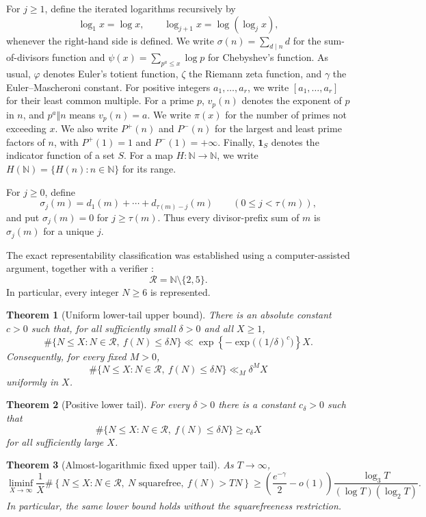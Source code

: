 \documentclass[11pt]{article}
\newtheorem{theorem}{Theorem}[section]
\theoremstyle{remark}
\newcommand{\N}{\mathbb N}
\newcommand{\Rcal}{\mathcal R}
\newcommand{\1}{\mathbf 1}
\begin{document}
For $j\geq1$, define the iterated logarithms recursively by
\[
 \log_1 x=\log x,\qquad \log_{j+1}x=\log(\log_j x),
\]
whenever the right-hand side is defined.  We write $\sigma(n)=\sum_{d\mid n}d$ for the sum-of-divisors
function and $\psi(x)=\sum_{p^a\leq x}\log p$ for Chebyshev's function.
As usual, $\varphi$ denotes Euler's totient function, $\zeta$ the Riemann
zeta function, and $\gamma$ the Euler--Mascheroni constant.  For positive
integers $a_1,\ldots,a_r$, we write $[a_1,\ldots,a_r]$ for their least common
multiple.  For a prime
$p$, $v_p(n)$ denotes the exponent of $p$ in $n$, and $p^a\Vert n$ means
$v_p(n)=a$.  We write $\pi(x)$ for the number of primes not exceeding $x$.
We also write $P^+(n)$ and $P^-(n)$ for the largest and least prime factors
of $n$, with $P^+(1)=1$ and $P^-(1)=+\infty$.  Finally, $\1_S$ denotes the
indicator function of a set $S$.  For a map $H:\N\to\N$, we write
$H(\N)=\{H(n):n\in\N\}$ for its range.

For $j\geq0$, define
\[
 \sigma_j(m)=d_1(m)+\cdots+d_{\tau(m)-j}(m)
 \qquad(0\leq j<\tau(m)),
\]
and put $\sigma_j(m)=0$ for $j\geq\tau(m)$.  Thus every divisor-prefix
sum of $m$ is $\sigma_j(m)$ for a unique $j$.

The exact representability classification was established using a
computer-assisted argument, together with a verifier \cite{jif,jifRepo}:
\begin{equation}\label{eq:exact-representability}
 \Rcal=\N\setminus\{2,5\}.
\end{equation}
In particular, every integer $N\geq6$ is represented.

\begin{theorem}[Uniform lower-tail upper bound]
\label{thm:small-upper}
There is an absolute constant $c>0$ such that, for all sufficiently small
$\delta>0$ and all $X\geq1$,
\[
 \#\{N\leq X:N\in\Rcal,\ f(N)\leq\delta N\}
 \ll \exp\!\left\{-\exp\bigl((1/\delta)^c\bigr)\right\}X.
\]
Consequently, for every fixed $M>0$,
\[
 \#\{N\leq X:N\in\Rcal,\ f(N)\leq\delta N\}
 \ll_M \delta^M X
\]
uniformly in $X$.
\end{theorem}

\begin{theorem}[Positive lower tail]\label{thm:small-values}
For every $\delta>0$ there is a constant $c_\delta>0$ such that
\[
 \#\{N\leq X:N\in\Rcal,\ f(N)\leq\delta N\}\geq c_\delta X
\]
for all sufficiently large $X$.
\end{theorem}

\begin{theorem}[Almost-logarithmic fixed upper tail]
\label{thm:almost-log-tail}
As $T\to\infty$,
\begin{equation}\label{eq:almost-log-tail}
 \liminf_{X\to\infty}\frac1X
 \#\left\{N\leq X:
       N\in\Rcal,\ N\text{ squarefree},\ f(N)>TN
       \right\}
 \geq\left(\frac{e^{-\gamma}}2-o(1)\right)
       \frac{\log_3T}{(\log T)(\log_2T)}.
\end{equation}
In particular, the same lower bound holds without the squarefreeness
restriction.
\end{theorem}
\end{document}
